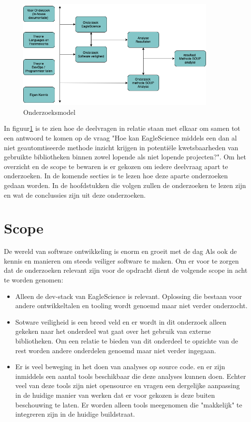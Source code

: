 \begin{figure}[htbp]
    \myfloatalign
    \includegraphics[width=10cm]{gfx/Onderzoekmodel}
    \caption{Onderzoeksmodel}
    \label{fig:OnderzoeksModel}
\end{figure}
In figuur\ref{fig:OnderzoeksModel} is te zien hoe de deelvragen in relatie staan met elkaar om samen tot een antwoord te komen op de vraag "Hoe kan EagleScience middels een dan al niet geautomtiseerde methode inzicht krijgen in potentiële kwetsbaarheden van gebruikte bibliotheken binnen zowel lopende als niet lopende projecten?". Om het overzicht en de scope te bewaren is er gekozen om iedere deelvraag apart te onderzoeken. In de komende secties is te lezen hoe deze aparte onderzoeken gedaan worden. In de hoofdstukken die volgen zullen de onderzoeken te lezen zijn en wat de conclussies zijn uit deze onderzoeken.

\section{Scope}\label{sec:Scope}
De wereld van software ontwikkeling is enorm en groeit met de dag Als ook de kennis en manieren om steeds veiliger software te maken. Om er voor te zorgen dat de onderzoeken relevant zijn voor de opdracht dient de volgende scope in acht te worden genomen:
\begin{itemize}
    \item Alleen de dev-stack van EagleScience is relevant. Oplossing die bestaan voor andere ontwikkeltalen en tooling wordt genoemd maar niet verder onderzocht.
    \item Sotware veiligheid is een breed veld en er wordt in dit onderzoek alleen gekeken naar het onderdeel wat gaat over het gebruik van externe bibliotheken. Om een relatie te bieden van dit onderdeel te opzichte van de rest worden andere onderdelen genoemd maar niet verder ingegaan.
    \item Er is veel beweging in het doen van analyses op source code. en er zijn inmiddels een aantal tools beschikbaar die deze analyses kunnen doen. Echter veel van deze tools zijn niet opensource en vragen een dergelijke aanpassing in de huidige manier van werken dat er voor gekozen is deze buiten beschouwing te laten. Er worden alleen tools meegenomen die "makkelijk" te integreren zijn in de huidige buildstraat.
\end{itemize}

